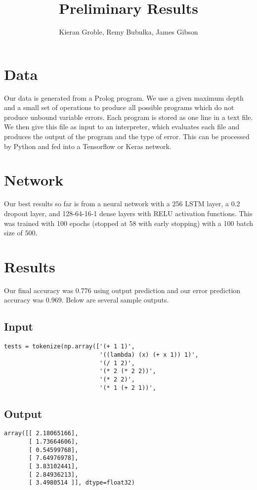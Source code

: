 \documentclass{article}
\author{Kieran Groble, Remy Bubulka, James Gibson}
\title{Preliminary Results}
\begin{document}
\maketitle

\section*{Data}

Our data is generated from a Prolog program. We use a given maximum depth and a
small set of operations to produce all possible programs which do not produce
unbound variable errors. Each program is stored as one line in a text file. We
then give this file as input to an interpreter, which evaluates each file and
produces the output of the program and the type of error. This can be processed
by Python and fed into a Tensorflow or Keras network.

\section*{Network}

Our best results so far is from a neural network with a 256 LSTM layer, a 0.2
dropout layer, and 128-64-16-1 dense layers with RELU activation functions. This
was trained with 100 epochs (stopped at 58 with early stopping) with a 100 batch
size of 500.

\section*{Results}

Our final accuracy was 0.776 using output prediction and our error prediction
accuracy was 0.969. Below are several sample outputs.

\subsection*{Input}
\begin{lstlisting}
tests = tokenize(np.array(['(+ 1 1)',
                           '((lambda) (x) (+ x 1)) 1)',
                           '(/ 1 2)',
                           '(* 2 (* 2 2))',
                           '(* 2 2)',
                           '(* 1 (+ 2 1))',
\end{lstlisting}

\subsection*{Output}

\begin{lstlisting}
array([[ 2.18065166],
       [ 1.73664606],
       [ 0.54599768],
       [ 7.64976978],
       [ 3.83102441],
       [ 2.84936213],
       [ 3.4980514 ]], dtype=float32)
\end{lstlisting}
\end{document}
